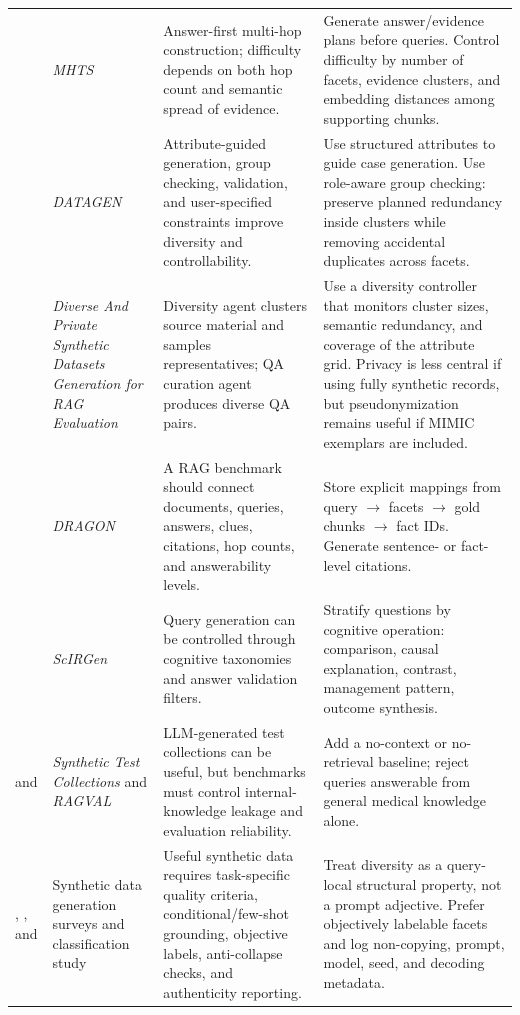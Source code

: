 \documentclass[11pt,a4paper]{article}
\begin{document}
\begin{longtable}{@{}p{2.25cm}p{3.65cm}p{4.2cm}p{4.6cm}@{}}
	\citet{lee2025mhts} & \emph{MHTS} & Answer-first multi-hop construction; difficulty depends on both hop count and semantic spread of evidence. & Generate answer/evidence plans before queries. Control difficulty by number of facets, evidence clusters, and embedding distances among supporting chunks.\\
	\citet{huang2025datagen} & \emph{DATAGEN} & Attribute-guided generation, group checking, validation, and user-specified constraints improve diversity and controllability. & Use structured attributes to guide case generation. Use role-aware group checking: preserve planned redundancy inside clusters while removing accidental duplicates across facets.\\
	\citet{driouich2025diverseprivate} & \emph{Diverse And Private Synthetic Datasets Generation for RAG Evaluation} & Diversity agent clusters source material and samples representatives; QA curation agent produces diverse QA pairs. & Use a diversity controller that monitors cluster sizes, semantic redundancy, and coverage of the attribute grid. Privacy is less central if using fully synthetic records, but pseudonymization remains useful if MIMIC exemplars are included.\\
	\citet{shen2026dragon} & \emph{DRAGON} & A RAG benchmark should connect documents, queries, answers, clues, citations, hop counts, and answerability levels. & Store explicit mappings from query $\rightarrow$ facets $\rightarrow$ gold chunks $\rightarrow$ fact IDs. Generate sentence- or fact-level citations.\\
	\citet{lin2025scirgen} & \emph{ScIRGen} & Query generation can be controlled through cognitive taxonomies and answer validation filters. & Stratify questions by cognitive operation: comparison, causal explanation, contrast, management pattern, outcome synthesis.\\
	\citet{rahmani2024synthetic} and \citet{kenneweg2024ragval} & \emph{Synthetic Test Collections} and \emph{RAGVAL} & LLM-generated test collections can be useful, but benchmarks must control internal-knowledge leakage and evaluation reliability. & Add a no-context or no-retrieval baseline; reject queries answerable from general medical knowledge alone.\\
	\citet{nadas2025synthetic}, \citet{figueira2022survey}, and \citet{li2023synthetic} & Synthetic data generation surveys and classification study & Useful synthetic data requires task-specific quality criteria, conditional/few-shot grounding, objective labels, anti-collapse checks, and authenticity reporting. & Treat diversity as a query-local structural property, not a prompt adjective. Prefer objectively labelable facets and log non-copying, prompt, model, seed, and decoding metadata.\\

\end{longtable}
\end{document}
